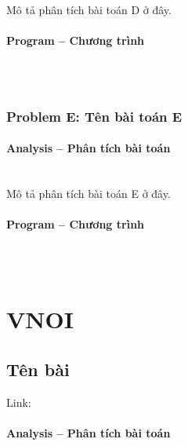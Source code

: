 \documentclass{article}
\begin{document}
Mô tả phân tích bài toán D ở đây.

\paragraph{Program -- Chương trình} \mbox{} \\

\begin{lstlisting}

\end{lstlisting}

\subsubsection{Problem E: Tên bài toán E}

\paragraph{Analysis -- Phân tích bài toán} \mbox{} \\

Mô tả phân tích bài toán E ở đây.

\paragraph{Program -- Chương trình} \mbox{} \\

\begin{lstlisting} 

\end{lstlisting}


\section{VNOI}

\subsection{Tên bài}
Link: \url{}


\paragraph{Analysis -- Phân tích bài toán} \mbox{} \\
\end{document}
